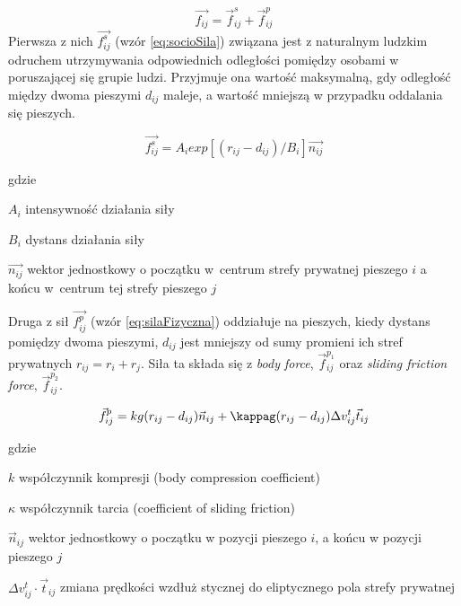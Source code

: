 \begin{equation}
\label{eq:sumaSil}
\vec{f_{ij}} = \vec{f}_{ij}^{s} + \vec{f}_{ij}^{p}
\end{equation}
Pierwsza z nich $\vec{f_{ij}^{s}}$ (wzór \ref{eq:socioSila}) związana jest z naturalnym ludzkim odruchem utrzymywania odpowiednich odległości pomiędzy osobami w poruszającej się grupie ludzi. Przyjmuje ona wartość maksymalną, gdy odległość między dwoma pieszymi $d_{ij}$ maleje, a wartość mniejszą w przypadku oddalania się pieszych.

\begin{equation}
\label{eq:socioSila}
\vec{f_{ij}^{s}} = A_{i} exp[(r_{ij} - d_{ij}) / B_{i}]\vec{n_{ij}}
\end{equation}

gdzie
\begin{eqwhere}[2cm]
	\item[$A_{i}$] intensywność działania siły
	\item[$B_{i}$] dystans działania siły
	\item[$\vec{n_{ij}}$] wektor jednostkowy o początku w~centrum strefy prywatnej pieszego $i$ a końcu w~centrum tej strefy pieszego $j$
\end{eqwhere}

Druga z sił $\vec{f_{ij}^{p}}$ (wzór \ref{eq:silaFizyczna}) oddziałuje na pieszych, kiedy dystans pomiędzy dwoma pieszymi, $d_{ij}$ jest mniejszy od sumy promieni ich stref prywatnych $r_{ij} = r_{i} + r_{j}$. Siła ta składa się z \textit{body force}, $\vec{f} _{ij}^{p_{1}}$ oraz \textit{sliding friction force}, $\vec{f} _{ij}^{p_{2}}$.

\begin{equation} \label{eq:silaFizyczna}
\vec{f}_{ij}^{p} = kg(r_{ij} - d_{ij})\vec{n}_{ij} + \kappag (r_{ij} - d_{ij}) \Delta v_{ij}^{t}\vec{t}_{ij}
\end{equation}

gdzie
\begin{eqwhere}[2cm]
	\item[$k$] współczynnik kompresji (body compression coefficient)
	\item[$\kappa$] współczynnik tarcia (coefficient of sliding friction)
	\item[$\vec{n}_{ij}$] wektor jednostkowy o początku w pozycji pieszego $i$, a końcu w pozycji pieszego $j$
	\item[$\Delta v_{ij}^{t} \cdot \vec{t}_{ij}$] zmiana prędkości wzdłuż stycznej do eliptycznego pola strefy prywatnej
\end{eqwhere}

